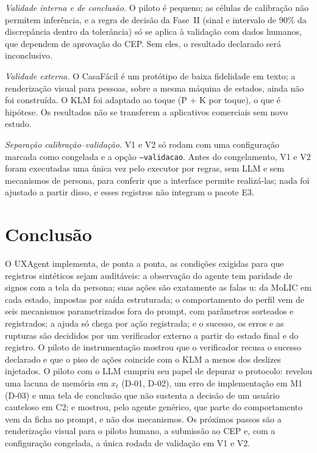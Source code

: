 \documentclass[conference]{IEEEtran}
\begin{document}
\textit{Validade interna e de conclusão.} O piloto é pequeno; as células de calibração não permitem inferência, e a regra de decisão da Fase~II (sinal e intervalo de 90\% da discrepância dentro da tolerância) só se aplica à validação com dados humanos, que dependem de aprovação do CEP. Sem eles, o resultado declarado será inconclusivo.

\textit{Validade externa.} O CasaFácil é um protótipo de baixa fidelidade em texto; a renderização visual para pessoas, sobre a mesma máquina de estados, ainda não foi construída. O KLM foi adaptado ao toque (P + K por toque), o que é hipótese. Os resultados não se transferem a aplicativos comerciais sem novo estudo.

\textit{Separação calibração--validação.} V1 e V2 só rodam com uma configuração marcada como congelada e a opção \texttt{--validacao}. Antes do congelamento, V1 e V2 foram executadas uma única vez pelo executor por regras, sem LLM e sem mecanismos de persona, para conferir que a interface permite realizá-las; nada foi ajustado a partir disso, e esses registros não integram o pacote E3.

\section{Conclusão}
O UXAgent implementa, de ponta a ponta, as condições exigidas para que registros sintéticos sejam auditáveis: a observação do agente tem paridade de signos com a tela da persona; suas ações são exatamente as falas u: da MoLIC em cada estado, impostas por saída estruturada; o comportamento do perfil vem de seis mecanismos parametrizados fora do prompt, com parâmetros sorteados e registrados; a ajuda só chega por ação registrada; e o sucesso, os erros e as rupturas são decididos por um verificador externo a partir do estado final e do registro. O piloto de instrumentação mostrou que o verificador recusa o sucesso declarado e que o piso de ações coincide com o KLM a menos dos deslizes injetados. O piloto com o LLM cumpriu seu papel de depurar o protocolo: revelou uma lacuna de memória em $x_t$ (D-01, D-02), um erro de implementação em M1 (D-03) e uma tela de conclusão que não sustenta a decisão de um usuário cauteloso em C2; e mostrou, pelo agente genérico, que parte do comportamento vem da ficha no prompt, e não dos mecanismos. Os próximos passos são a renderização visual para o piloto humano, a submissão ao CEP e, com a configuração congelada, a única rodada de validação em V1 e V2.



\end{document}
